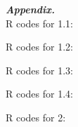 \documentclass[10pt]{article}
\begin{document}
\newpage

\color{Black}

\textbf{\textit{Appendix.}}\\

R codes for 1.1:

\vspace{3mm}

R codes for 1.2:

\vspace{3mm}

R codes for 1.3:

\vspace{3mm}

R codes for 1.4:

\vspace{3mm}

R codes for 2:

\vspace{3mm}
\end{document}
